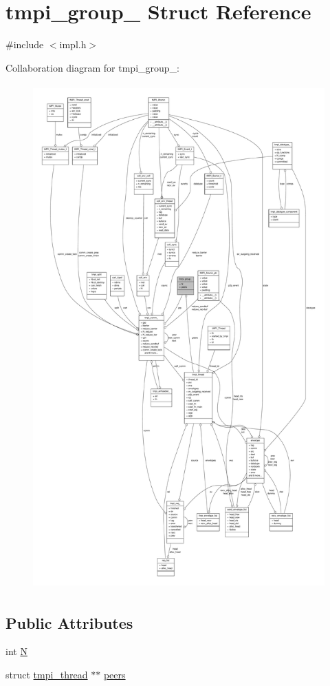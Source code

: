 \hypertarget{structtmpi__group__}{\section{tmpi\-\_\-group\-\_\- \-Struct \-Reference}
\label{structtmpi__group__}
}


{\ttfamily \#include $<$impl.\-h$>$}



\-Collaboration diagram for tmpi\-\_\-group\-\_\-\-:
\nopagebreak
\begin{figure}[H]
\begin{center}
\leavevmode
\includegraphics[height=550pt]{structtmpi__group____coll__graph}
\end{center}
\end{figure}
\subsection*{\-Public \-Attributes}
\begin{DoxyCompactItemize}
\item 
int \hyperlink{structtmpi__group___abb8dcfd2a40e4cd194cd90034d953ebd}{\-N}
\item 
struct \hyperlink{structtmpi__thread}{tmpi\-\_\-thread} $\ast$$\ast$ \hyperlink{structtmpi__group___a638315fa398a4e2a1c7ecbbe99bd52f6}{peers}
\end{DoxyCompactItemize}


